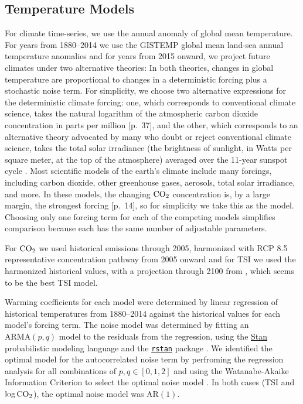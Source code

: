 \documentclass{wscpaperproc}\usepackage[]{graphicx}\usepackage[]{color}
\newcommand{\ARMA}{\text{ARMA}}
\newcommand{\AR}{\text{AR}}
\begin{document}
\subsection{Temperature Models}%
\label{sec:temp.models}

For climate time-series, we use the annual anomaly of global mean temperature. For years from 1880--2014 we use the GISTEMP global mean land-sea annual temperature anomalies  and for years from 2015 onward, we project future climates under two alternative theories: In both theories, changes in global temperature are proportional to changes in a deterministic forcing plus a stochastic noise term. For simplicity, we choose two alternative expressions for the deterministic climate forcing: one, which corresponds to conventional climate science, takes the natural logarithm of the atmospheric carbon dioxide concentration in parts per million [p.~37], and the other, which corresponds to an alternative theory advocated by many who doubt or reject conventional climate science, takes the total solar irradiance (the brightness of sunlight, in Watts per square meter, at the top of the atmosphere) averaged over the 11-year sunspot cycle .  Most scientific models of the earth's climate include many forcings, including carbon dioxide, other greenhouse gases, aerosols, total solar irradiance, and more. In these models, the changing $\ce{CO2}$ concentration is, by a large margin, the strongest forcing [p.~14], so for simplicity we take this as the model. Choosing only one forcing term for each of the competing models simplifies comparison because each has the same number of adjustable parameters.

For $\ce{CO2}$ we used historical emissions through 2005, harmonized with RCP 8.5 representative concentration pathway from 2005 onward  and for TSI we used the harmonized historical values, with a projection through 2100 from , which seems to be the best TSI model.

Warming coefficients for each model were determined by linear regression of historical temperatures from 1880--2014 against the historical values for each model's forcing term. The noise model was determined by fitting an $\ARMA(p,q)$ model to the residuals from the regression, using the \href{http://mc-stan.org}{Stan} probabilistic modeling language and the \href{https://cran.r-project.org/web/packages/rstan/}{\texttt{rstan}} package . We identified the optimal model for the autocorrelated noise term by perfroming the regression analysis for all combinations of $p, q \in [0,1,2]$ and using the Watanabe-Akaike Information Criterion to select the optimal noise model . In both cases (TSI and $\log\ce{CO2}$), the optimal noise model was $\AR(1)$.
\end{document}

